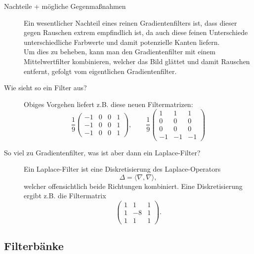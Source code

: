\begin{description}
$$       $$
	\item[Nachteile + mögliche Gegenmaßnahmen]
      Ein wesentlicher Nachteil eines reinen Gradientenfilters ist, dass dieser gegen Rauschen extrem empfindlich ist, da
      auch diese feinen Unterschiede unterschiedliche Farbwerte und damit potenzielle Kanten liefern.\\
      Um dies zu beheben, kann man den Gradientenfilter mit einem Mittelwertfilter kombinieren, welcher das Bild glättet 
      und damit Rauschen entfernt, gefolgt vom eigentlichen Gradientenfilter.\\
	\item[Wie sieht so ein Filter aus?]
      Obiges Vorgehen liefert z.B. diese neuen Filtermatrizen:
      $$ \frac{1}{9}\begin{pmatrix}-1&0&0&1\\-1&0&0&1\\-1&0&0&1\end{pmatrix},\qquad \frac{1}{9}\begin{pmatrix}1&1&1\\0&0&0\\0&0&0\\-1&-1&-1\end{pmatrix}$$
    \item[So viel zu Gradientenfilter, was ist aber dann ein Laplace-Filter?]
      Ein Laplace-Filter ist eine Diskretisierung des Laplace-Operators
      $$ \Delta = \langle \nabla, \nabla \rangle, $$
      welcher offensichtlich beide Richtungen kombiniert. Eine Diskretisierung ergibt z.B. die Filtermatrix
      $$ \begin{pmatrix} 1&1&1\\1&-8&1\\1&1&1 \end{pmatrix}.$$
\end{description}
\subsection{Filterbänke}


